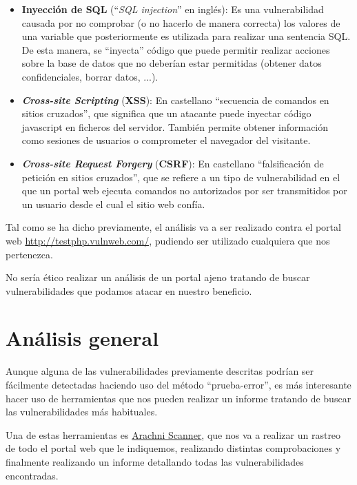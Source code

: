 \documentclass{\ClassPath/viu-tfm-template}
\begin{document}
\begin{itemize}
    \item \textbf{Inyección de SQL} (“\textit{SQL injection}” en inglés): Es una vulnerabilidad causada por no comprobar (o no hacerlo de  manera correcta) los valores de una variable que posteriormente es utilizada para realizar una sentencia SQL. De esta manera, se “inyecta” código que puede permitir realizar acciones sobre la base de datos que no deberían estar permitidas (obtener datos confidenciales, borrar datos, ...).

    \item \textbf{\textit{Cross-site Scripting}} (\textbf{XSS}): En castellano “secuencia de comandos en sitios cruzados”, que significa que un atacante puede inyectar código javascript en ficheros del servidor. También permite obtener información como sesiones de usuarios o comprometer el navegador del visitante.

    \item \textbf{\textit{Cross-site Request Forgery}} (\textbf{CSRF}): En castellano “falsificación de petición en sitios cruzados”, que se refiere a un tipo de  vulnerabilidad en el que un portal web ejecuta comandos no autorizados por ser transmitidos por un usuario desde el cual el sitio web confía.
\end{itemize}

Tal como se ha dicho previamente, el análisis va a ser realizado contra el portal web \href{http://testphp.vulnweb.com/}{http://testphp.vulnweb.com/}, pudiendo ser utilizado cualquiera que nos pertenezca.

No sería ético realizar un análisis de un portal ajeno tratando de buscar vulnerabilidades que podamos atacar en nuestro beneficio.


\chapter{Análisis general}

Aunque alguna de las vulnerabilidades previamente descritas podrían ser fácilmente detectadas haciendo uso del método “prueba-error”, es más interesante hacer uso de herramientas que nos pueden realizar un informe tratando de buscar las vulnerabilidades más habituales.

Una de estas herramientas es \href{https://www.arachni-scanner.com/}{Arachni Scanner}, que nos va a realizar un rastreo de todo el portal web que le indiquemos, realizando distintas comprobaciones y finalmente realizando un informe detallando todas las vulnerabilidades encontradas.
\end{document}
